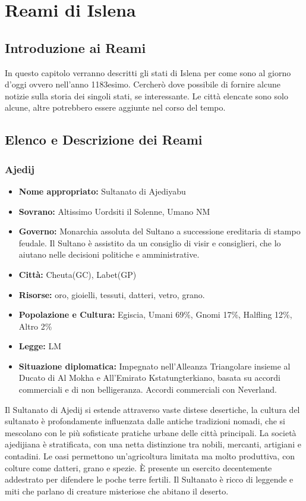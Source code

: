 \documentclass[a4paper]{report}
\begin{document}
\chapter{Reami di Islena}
\begin{multicols}{2}
	
\section{Introduzione ai Reami}
In questo capitolo verranno descritti gli stati di Islena per come sono al giorno d'oggi ovvero nell'anno 1183esimo. Cercherò dove possibile di fornire alcune notizie sulla storia dei singoli stati, se interessante. Le città elencate sono solo alcune, altre potrebbero essere aggiunte nel corso del tempo.
\section{Elenco e Descrizione dei Reami}

\subsection*{Ajedij}
\begin{itemize}
	\item \textbf{Nome appropriato:} Sultanato di Ajediyabu
	\item \textbf{Sovrano: }Altissimo Uordsiti il Solenne, Umano NM
	\item \textbf{Governo: }Monarchia assoluta del Sultano a successione ereditaria di stampo feudale. Il Sultano è assistito da un consiglio di visir e consiglieri, che lo aiutano nelle decisioni politiche e amministrative.
	\item \textbf{Città: }Cheuta(GC), Labet(GP)
	\item \textbf{Risorse:}  oro, gioielli, tessuti, datteri, vetro, grano.
	\item \textbf{Popolazione e Cultura:} Egiscia, Umani 69\%, Gnomi 17\%, Halfling 12\%, Altro 2\% 
	\item \textbf{Legge: }LM
	\item \textbf{Situazione diplomatica: }Impegnato nell'Alleanza Triangolare insieme al Ducato di Al Mokha e All'Emirato Kstatungterkiano, basata su accordi commerciali e di non belligeranza. Accordi commerciali con Neverland.
\end{itemize}
Il Sultanato di Ajedij si estende attraverso vaste distese desertiche, la cultura del sultanato è profondamente influenzata dalle antiche tradizioni nomadi, che si mescolano con le più sofisticate pratiche urbane delle città principali. La società ajedijiana è stratificata, con una netta distinzione tra nobili, mercanti, artigiani e contadini. Le oasi permettono un'agricoltura limitata ma molto produttiva, con colture come datteri, grano e spezie. \`{E} presente un esercito decentemente addestrato per difendere le poche terre fertili. Il Sultanato è ricco di leggende e miti che parlano di creature misteriose che abitano il deserto.


\end{multicols}
\end{document}
